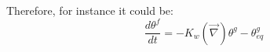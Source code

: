 Therefore, for instance it could be:
\begin{equation}
\frac{d \theta^f}{dt} = - K_w (\vec{\nabla}){\theta^g - \theta^g_{eq}}
\end{equation}